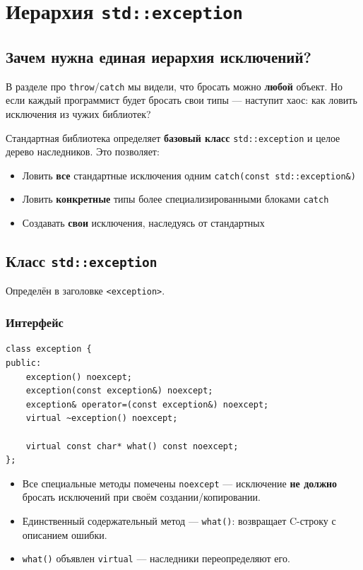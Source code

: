 \documentclass[a4paper,12pt]{article}
\begin{document}
\newpage
\section{Иерархия \texttt{std::exception}}

\subsection{Зачем нужна единая иерархия исключений?}

В разделе про \texttt{throw}/\texttt{catch} мы видели, что бросать можно
\textbf{любой} объект. Но если каждый программист будет бросать свои типы ---
наступит хаос: как ловить исключения из чужих библиотек?

Стандартная библиотека определяет \textbf{базовый класс} \texttt{std::exception}
и целое дерево наследников. Это позволяет:
\begin{itemize}
    \item Ловить \textbf{все} стандартные исключения одним \texttt{catch(const std::exception\&)}
    \item Ловить \textbf{конкретные} типы более специализированными блоками \texttt{catch}
    \item Создавать \textbf{свои} исключения, наследуясь от стандартных
\end{itemize}

\subsection{Класс \texttt{std::exception}}

Определён в заголовке \texttt{<exception>}.

\subsubsection{Интерфейс}

\begin{lstlisting}
class exception {
public:
    exception() noexcept;
    exception(const exception&) noexcept;
    exception& operator=(const exception&) noexcept;
    virtual ~exception() noexcept;

    virtual const char* what() const noexcept;
};
\end{lstlisting}

\begin{itemize}
    \item Все специальные методы помечены \texttt{noexcept} --- исключение
          \textbf{не должно} бросать исключений при своём создании/копировании.
    \item Единственный содержательный метод --- \texttt{what()}: возвращает
          C-строку с описанием ошибки.
    \item \texttt{what()} объявлен \texttt{virtual} --- наследники переопределяют его.
\end{itemize}
\end{document}
